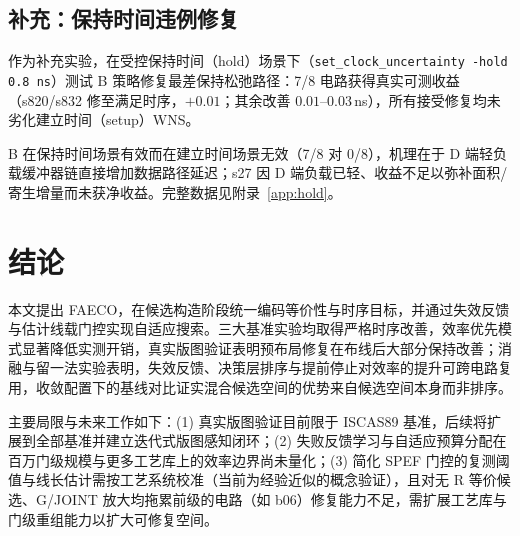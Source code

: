 \documentclass[journal]{IEEEtran}
\begin{document}
\subsection{补充：保持时间违例修复}\label{sec:hold}

作为补充实验，在受控保持时间（hold）场景下（\texttt{set\_clock\_uncertainty -hold 0.8\,ns}）测试 B 策略修复最差保持松弛路径：7/8 电路获得真实可测收益（s820/s832 修至满足时序，$+0.01$；其余改善 $0.01$--$0.03\,$ns），所有接受修复均未劣化建立时间（setup）WNS。

B 在保持时间场景有效而在建立时间场景无效（7/8 对 0/8），机理在于 D 端轻负载缓冲器链直接增加数据路径延迟；s27 因 D 端负载已轻、收益不足以弥补面积/寄生增量而未获净收益。完整数据见附录~\ref{app:hold}。

\section{结论}\label{sec:conclusion}

本文提出 FAECO，在候选构造阶段统一编码等价性与时序目标，并通过失效反馈与估计线载门控实现自适应搜索。三大基准实验均取得严格时序改善，效率优先模式显著降低实测开销，真实版图验证表明预布局修复在布线后大部分保持改善；消融与留一法实验表明，失效反馈、决策层排序与提前停止对效率的提升可跨电路复用，收敛配置下的基线对比证实混合候选空间的优势来自候选空间本身而非排序。

主要局限与未来工作如下：(1) 真实版图验证目前限于 ISCAS89 基准，后续将扩展到全部基准并建立迭代式版图感知闭环；(2) 失败反馈学习与自适应预算分配在百万门级规模与更多工艺库上的效率边界尚未量化；(3) 简化 SPEF 门控的复测阈值与线长估计需按工艺系统校准（当前为经验近似的概念验证），且对无 R 等价候选、G/JOINT 放大均拖累前级的电路（如 b06）修复能力不足，需扩展工艺库与门级重组能力以扩大可修复空间。
\end{document}
